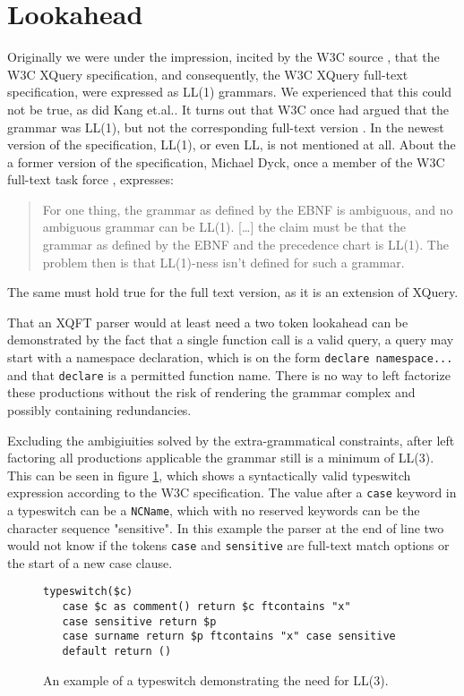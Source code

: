 \section{Lookahead}
\label{sect:discussion:lookahead}
Originally we were under the impression, incited by the W3C source
\cite{createTokenizer}, that the W3C XQuery specification, and consequently,
the W3C XQuery full-text specification, were expressed as LL(1) grammars. We
experienced that this could not be true, as did Kang
et.al.\cite{kang_xquery_diglib}. It turns out that W3C once had argued that the
grammar was LL(1), but not the corresponding full-text version
\cite{grammarIsLL1}. In the newest version of the specification, LL(1), or even
LL, is not mentioned at all. About the a former version of the specification, 
Michael Dyck, once a member of the W3C full-text task force
\cite{dyckIsTaskForce}, expresses\cite{dyckOnList}:

\begin{quote}
For one thing, the grammar as defined by the EBNF is ambiguous, and no ambiguous grammar can be LL(1). [\ldots] the claim must be that the grammar as defined by the EBNF and the precedence chart is LL(1). The problem then is that LL(1)-ness isn't defined for such a grammar.
\end{quote}
The same must hold true for the full text version, as it is an extension of XQuery.

That an XQFT parser would at least need a two token lookahead can be
demonstrated by the fact that a single function call is a valid query, a query
may start with a namespace declaration, which is on the form 
\verb!declare namespace...! and that \verb!declare! is a permitted function
name. There is no way to left factorize these productions without the risk of
rendering the grammar complex and possibly containing redundancies.     

Excluding the ambigiuities solved by the extra-grammatical constraints, after left factoring all productions applicable the grammar still is a minimum of LL(3). This can be seen in figure \ref{fig:notLL2}, which shows a syntactically valid typeswitch expression according to the W3C specification. The value after a \verb!case! keyword in a typeswitch can be a \verb!NCName!, which with no reserved keywords can be the character sequence "sensitive". In this example the parser at the end of line two would not know if the tokens \verb!case! and \verb!sensitive! are full-text match options or the start of a new case clause.

\begin{figure}[h!]
\begin{Verbatim}
typeswitch($c) 
   case $c as comment() return $c ftcontains "x"
   case sensitive return $p
   case surname return $p ftcontains "x" case sensitive
   default return ()
\end{Verbatim}
\label{fig:notLL2}
\caption[A typeswitch shows the need for LL(3)]{An example of a typeswitch demonstrating the need for LL(3).}
\end{figure}

